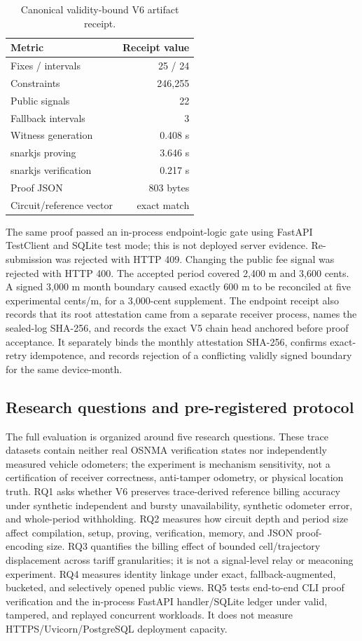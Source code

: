 \documentclass[conference]{IEEEtran}
\theoremstyle{plain}
\theoremstyle{definition}
\begin{document}
\begin{table}[t]
\centering
\caption{Canonical validity-bound V6 artifact receipt.}
\label{tab:v6}
\small
\begin{tabular}{lr}
\toprule
Metric & Receipt value \\
\midrule
Fixes / intervals & 25 / 24 \\
Constraints & 246,255 \\
Public signals & 22 \\
Fallback intervals & 3 \\
Witness generation & 0.408 s \\
snarkjs proving & 3.646 s \\
snarkjs verification & 0.217 s \\
Proof JSON & 803 bytes \\
Circuit/reference vector & exact match \\
\bottomrule
\end{tabular}
\end{table}

The same proof passed an in-process endpoint-logic gate using FastAPI
TestClient and SQLite test mode; this is not deployed server evidence.
Re-submission was
rejected with HTTP 409. Changing the public fee signal was rejected with HTTP
400. The accepted period covered 2,400 m and 3,600 cents. A signed 3,000 m month
boundary caused exactly 600 m to be reconciled at five experimental cents/m,
for a 3,000-cent
supplement. The endpoint receipt also records that its root attestation came
from a separate receiver process, names the sealed-log SHA-256, and records
the exact V5 chain head anchored before proof acceptance. It separately binds
the monthly attestation SHA-256, confirms exact-retry idempotence, and records
rejection of a conflicting validly signed boundary for the same device-month.

\subsection{Research questions and pre-registered protocol}

The full evaluation is organized around five research questions. These trace
datasets contain neither real OSNMA verification states nor independently
measured vehicle odometers; the experiment is mechanism sensitivity, not a
certification of receiver correctness, anti-tamper odometry, or physical
location truth. RQ1 asks whether V6 preserves trace-derived reference billing
accuracy under synthetic independent and bursty unavailability, synthetic
odometer error, and whole-period withholding. RQ2 measures
how circuit depth and period size affect compilation, setup, proving,
verification, memory, and JSON proof-encoding size. RQ3 quantifies the billing
effect of bounded cell/trajectory displacement across tariff granularities; it
is not a signal-level relay or meaconing experiment. RQ4 measures
identity linkage under exact, fallback-augmented, bucketed, and selectively
opened public views. RQ5 tests end-to-end CLI proof verification and the
in-process FastAPI handler/SQLite ledger under valid, tampered, and replayed
concurrent workloads. It does not measure HTTPS/Uvicorn/PostgreSQL deployment
capacity.
\end{document}
